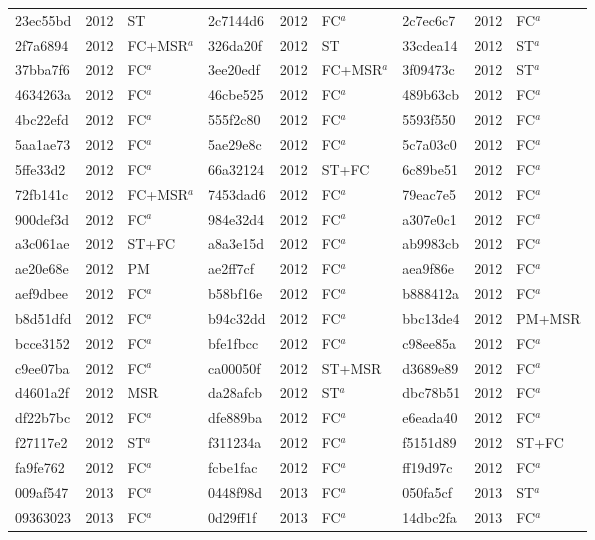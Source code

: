 \begin{longtable}{lll@{\hspace{10pt}}lll@{\hspace{10pt}}lll}
23ec55bd & 2012 & ST & 2c7144d6 & 2012 & FC$^{a}$ & 2c7ec6c7 & 2012 & FC$^{a}$ \\
2f7a6894 & 2012 & FC+MSR$^{a}$ & 326da20f & 2012 & ST & 33cdea14 & 2012 & ST$^{a}$ \\
37bba7f6 & 2012 & FC$^{a}$ & 3ee20edf & 2012 & FC+MSR$^{a}$ & 3f09473c & 2012 & ST$^{a}$ \\
4634263a & 2012 & FC$^{a}$ & 46cbe525 & 2012 & FC$^{a}$ & 489b63cb & 2012 & FC$^{a}$ \\
4bc22efd & 2012 & FC$^{a}$ & 555f2c80 & 2012 & FC$^{a}$ & 5593f550 & 2012 & FC$^{a}$ \\
5aa1ae73 & 2012 & FC$^{a}$ & 5ae29e8c & 2012 & FC$^{a}$ & 5c7a03c0 & 2012 & FC$^{a}$ \\
5ffe33d2 & 2012 & FC$^{a}$ & 66a32124 & 2012 & ST+FC & 6c89be51 & 2012 & FC$^{a}$ \\
72fb141c & 2012 & FC+MSR$^{a}$ & 7453dad6 & 2012 & FC$^{a}$ & 79eac7e5 & 2012 & FC$^{a}$ \\
900def3d & 2012 & FC$^{a}$ & 984e32d4 & 2012 & FC$^{a}$ & a307e0c1 & 2012 & FC$^{a}$ \\
a3c061ae & 2012 & ST+FC & a8a3e15d & 2012 & FC$^{a}$ & ab9983cb & 2012 & FC$^{a}$ \\
ae20e68e & 2012 & PM & ae2ff7cf & 2012 & FC$^{a}$ & aea9f86e & 2012 & FC$^{a}$ \\
aef9dbee & 2012 & FC$^{a}$ & b58bf16e & 2012 & FC$^{a}$ & b888412a & 2012 & FC$^{a}$ \\
b8d51dfd & 2012 & FC$^{a}$ & b94c32dd & 2012 & FC$^{a}$ & bbc13de4 & 2012 & PM+MSR \\
bcce3152 & 2012 & FC$^{a}$ & bfe1fbcc & 2012 & FC$^{a}$ & c98ee85a & 2012 & FC$^{a}$ \\
c9ee07ba & 2012 & FC$^{a}$ & ca00050f & 2012 & ST+MSR & d3689e89 & 2012 & FC$^{a}$ \\
d4601a2f & 2012 & MSR & da28afcb & 2012 & ST$^{a}$ & dbc78b51 & 2012 & FC$^{a}$ \\
df22b7bc & 2012 & FC$^{a}$ & dfe889ba & 2012 & FC$^{a}$ & e6eada40 & 2012 & FC$^{a}$ \\
f27117e2 & 2012 & ST$^{a}$ & f311234a & 2012 & FC$^{a}$ & f5151d89 & 2012 & ST+FC \\
fa9fe762 & 2012 & FC$^{a}$ & fcbe1fac & 2012 & FC$^{a}$ & ff19d97c & 2012 & FC$^{a}$ \\
009af547 & 2013 & FC$^{a}$ & 0448f98d & 2013 & FC$^{a}$ & 050fa5cf & 2013 & ST$^{a}$ \\
09363023 & 2013 & FC$^{a}$ & 0d29ff1f & 2013 & FC$^{a}$ & 14dbc2fa & 2013 & FC$^{a}$ \\

\end{longtable}

